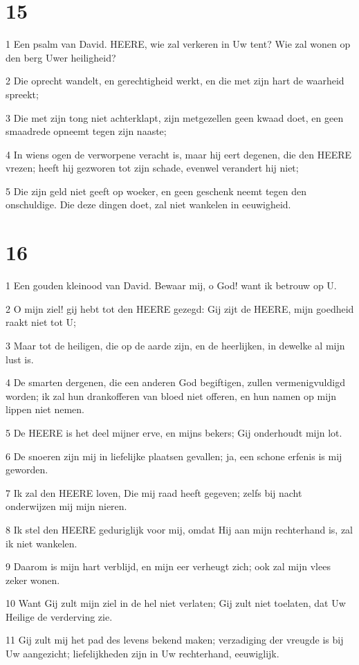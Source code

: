 \chapter{15}

\par 1 Een psalm van David. HEERE, wie zal verkeren in Uw tent? Wie zal wonen op den berg Uwer heiligheid?
\par 2 Die oprecht wandelt, en gerechtigheid werkt, en die met zijn hart de waarheid spreekt;
\par 3 Die met zijn tong niet achterklapt, zijn metgezellen geen kwaad doet, en geen smaadrede opneemt tegen zijn naaste;
\par 4 In wiens ogen de verworpene veracht is, maar hij eert degenen, die den HEERE vrezen; heeft hij gezworen tot zijn schade, evenwel verandert hij niet;
\par 5 Die zijn geld niet geeft op woeker, en geen geschenk neemt tegen den onschuldige. Die deze dingen doet, zal niet wankelen in eeuwigheid.

\chapter{16}

\par 1 Een gouden kleinood van David. Bewaar mij, o God! want ik betrouw op U.
\par 2 O mijn ziel! gij hebt tot den HEERE gezegd: Gij zijt de HEERE, mijn goedheid raakt niet tot U;
\par 3 Maar tot de heiligen, die op de aarde zijn, en de heerlijken, in dewelke al mijn lust is.
\par 4 De smarten dergenen, die een anderen God begiftigen, zullen vermenigvuldigd worden; ik zal hun drankofferen van bloed niet offeren, en hun namen op mijn lippen niet nemen.
\par 5 De HEERE is het deel mijner erve, en mijns bekers; Gij onderhoudt mijn lot.
\par 6 De snoeren zijn mij in liefelijke plaatsen gevallen; ja, een schone erfenis is mij geworden.
\par 7 Ik zal den HEERE loven, Die mij raad heeft gegeven; zelfs bij nacht onderwijzen mij mijn nieren.
\par 8 Ik stel den HEERE geduriglijk voor mij, omdat Hij aan mijn rechterhand is, zal ik niet wankelen.
\par 9 Daarom is mijn hart verblijd, en mijn eer verheugt zich; ook zal mijn vlees zeker wonen.
\par 10 Want Gij zult mijn ziel in de hel niet verlaten; Gij zult niet toelaten, dat Uw Heilige de verderving zie.
\par 11 Gij zult mij het pad des levens bekend maken; verzadiging der vreugde is bij Uw aangezicht; liefelijkheden zijn in Uw rechterhand, eeuwiglijk.

